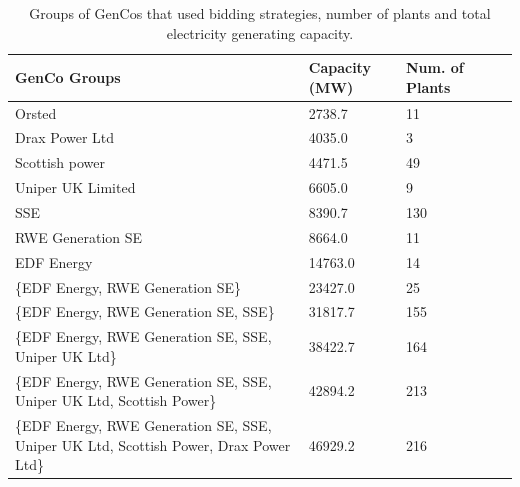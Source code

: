 \begin{table}
	\footnotesize
	\renewcommand{\arraystretch}{1.25}
	\centering
	\begin{tabular}{llllp{1.5cm}}
		\toprule
		GenCo Groups                                                                                                                  & Capacity (MW) & Num. of Plants \\ \midrule
		Orsted                                                                                                                       & 2738.7   & 11               \\
		Drax Power Ltd                                                                                                               & 4035.0   & 3                \\
		Scottish power                                                                                                               & 4471.5   & 49               \\
		Uniper UK Limited                                                                                                            & 6605.0   & 9                \\
		SSE                                                                                                                          & 8390.7   & 130              \\
		RWE Generation SE                                                                                                            & 8664.0   & 11               \\
		EDF Energy                                                                                                                   & 14763.0  & 14               \\
		\{EDF Energy, RWE Generation SE\}                                                                                              & 23427.0  & 25               \\
		\{EDF Energy, RWE Generation SE, SSE\}                                          & 31817.7  & 155              \\
		\{EDF Energy, RWE Generation SE, SSE, Uniper UK Ltd\}                              & 38422.7  & 164              \\
		\{EDF Energy, RWE Generation SE, SSE, Uniper UK Ltd, Scottish Power\}              & 42894.2  & 213              \\
		\{EDF Energy, RWE Generation SE, SSE, Uniper UK Ltd, Scottish Power, Drax Power Ltd\} & 46929.2  & 216              \\ 
		\bottomrule
	\end{tabular}
	\caption{Groups of GenCos that used bidding strategies, number of plants and total electricity generating capacity.}
	\label{table:genco_table}
\end{table}


